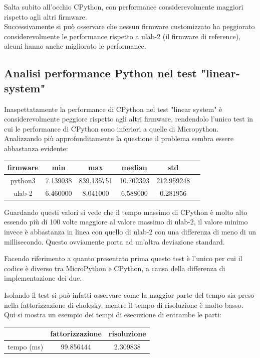 \documentclass[12pt,a4paper]{report}
\begin{document}
Salta subito all'occhio CPython, con performance
considerevolmente maggiori rispetto agli altri firmware.\\
Successivamente si può osservare che nessun firmware customizzato ha
peggiorato considerevolmente le performance rispetto a ulab-2 (il
firmware di reference), alcuni hanno anche migliorato le performance.

\subsection{Analisi performance Python nel test "linear-system"}

Inaspettatamente la performance di CPython nel test "linear system" è
considerevolmente peggiore rispetto agli altri firmware, rendendolo
l'unico test in cui le performance di CPython sono
inferiori a quelle di Micropython.\\
Analizzando più approfonditamente la questione il problema sembra essere
abbastanza evidente:


\begin{center}
\begin{tabular}{|c | c | c | c | c | c |}
\hline
firmware & min & max & median & std \\
\hline
python3 & 7.139038 & 839.135751 & 10.702393 &212.959248 \\
ulab-2 & 6.460000 & 8.041000 & 6.588000 & 0.281956 \\
\hline
\end{tabular}
\end{center}

Guardando questi valori si vede che il tempo massimo di CPython è molto
alto essendo più di 100 volte maggiore al valore massimo di ulab-2, il
valore minimo invece è abbastanza in linea con quello di ulab-2 con una
differenza di meno di un millisecondo. Questo ovviamente porta ad
un'altra deviazione standard.

Facendo riferimento a quanto presentato prima questo test è
l'unico per cui il codice è diverso tra MicroPython e
CPython, a causa della differenza di implementazione dei due.

Isolando il test si può infatti osservare come la maggior parte del
tempo sia preso nella fattorizzazione di cholesky, mentre il tempo di
risoluzione è molto basso.\\
Qui si mostra un esempio dei tempi di esecuzione di entrambe le parti:

\begin{center}
\begin{tabular}{|c | c | c |}
\hline
 &fattorizzazione & risoluzione \\
\hline
tempo (ms) & 99.856444 & 2.309838 \\
\hline
\end{tabular}
\end{center}
\end{document}
